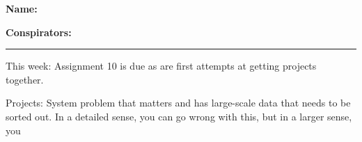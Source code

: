 \textbf{Name:} \\

\medskip

\textbf{Conspirators:} 

\medskip
\medskip

\hrule

\medskip


\assignmentsonly{\pleasesubmitprojectdraft}

This week: Assignment 10 is due as are first attempts at getting projects together.

Projects: System problem that matters and has large-scale data that needs to be sorted out.
In a detailed sense, you can go wrong with this, but in a larger sense, you 
